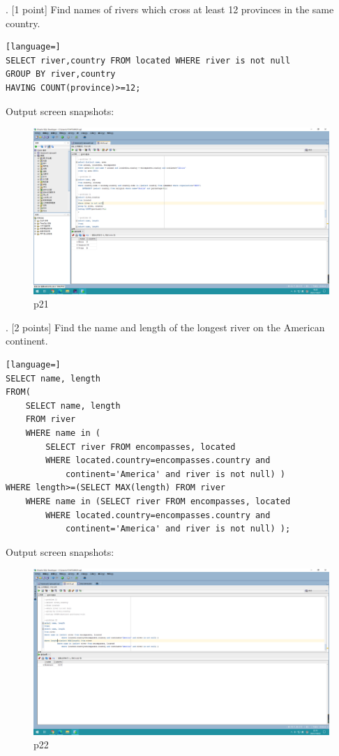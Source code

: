 \documentclass[]{article}
\begin{document}
	. [1 point] Find names of rivers which cross at least 12 provinces in the same country.   \\
	
	\begin{lstlisting}[language=] 
SELECT river,country FROM located WHERE river is not null
GROUP BY river,country
HAVING COUNT(province)>=12;
	\end{lstlisting} 
	Output screen snapshots:
	\begin{figure}[H]
		\centering
		\includegraphics[width=0.7\linewidth]{../screen/p21}
		\caption{p21}
		\label{fig:p21}
	\end{figure}
	
	. [2 points] Find the name and length of the longest river on the American continent.   \\
	
	\begin{lstlisting}[language=] 
SELECT name, length
FROM(
	SELECT name, length
	FROM river
	WHERE name in (
		SELECT river FROM encompasses, located 
		WHERE located.country=encompasses.country and 
			continent='America' and river is not null) )
WHERE length>=(SELECT MAX(length) FROM river
	WHERE name in (SELECT river FROM encompasses, located 
		WHERE located.country=encompasses.country and 
			continent='America' and river is not null) );
	\end{lstlisting} 
	Output screen snapshots:
	\begin{figure}[H]
		\centering
		\includegraphics[width=1\linewidth]{../screen/p22}
		\caption{p22}
		\label{fig:p22}
	\end{figure}
	
\end{document}
